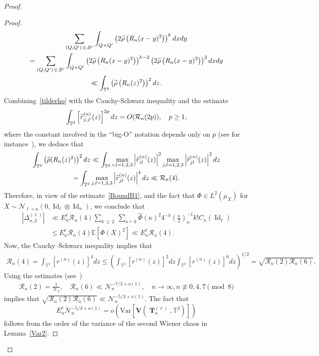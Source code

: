 \documentclass[10pt]{amsart}
\theoremstyle{definition}\newtheorem{defi}[theo]{Definition}\newtheorem{rema}[theo]{Remark}\newtheorem{exam}[theo]{Example}\newtheorem{exem}[theo]{Example}\newtheorem{nota}[theo]{Notation}
\DeclareMathOperator{\Id}{Id}
\DeclareMathOperator{\bT}{\mathbf{T}}
\newcommand{\scN}{\mathscr{N}}
\newcommand{\bfv}{\mathbf{V}}
\newcommand{\clS}{\mathcal{S}}
\newcommand{\clR}{\mathcal{R}}
\newcommand{\T}{\mathbb{T}^3}
\newcommand{\E}[1]{\mathbb{E}\left[#1\right]}
\newcommand{\V}[1]{\mathrm{Var}{\left[#1\right]}}
\newcommand{\notcon}[3]{ {#1} \not\equiv {#2} \pmod {#3} }
\newcommand{\Nn}{\mathcal{N}_n}
\let\oldtilde\tilde
\renewcommand*{\tilde}[1]{\mathchoice{\widetilde{#1}}{\widetilde{#1}}{\oldtilde{#1}}{\oldtilde{#1}}}
\begin{document}
\begin{proof}
\begin{proof}
\begin{multline*}
\sum_{(Q,Q')\,\in\,\clS^c}
\int_{Q\times Q'}
\left(2 \tilde{\rho}\left(R_n(x-y)^2\right) \right)^{k} dxdy\\
= \sum_{(Q,Q')\,\in\,\clS^c}
\int_{Q\times Q'}
\left(2 \tilde{\rho}\left(R_n(x-y)^2\right) \right)^{k-2}
\left(2 \tilde{\rho}\left(R_n(x-y)^2\right) \right)^{2} dxdy \\
\ll \int_{\T}
\left(\tilde{\rho}\left(R_n(z)^2\right) \right)^{2} dz. \\
\end{multline*}
Combining~\eqref{tilderho} with the Cauchy-Schwarz inequality and the estimate
\begin{gather*}
\int_{\T} \left[\tilde{r}^{(n)}_{j,j'}(z)\right]^{2p} dz = O(\clR_n(2p)), \quad p\geq1,
\end{gather*}
where the constant involved in the ``big-O'' notation depends only on $p$ (see for instance~\cite[Lemma~E.2]{Not20}), we deduce that
\begin{multline*}
\int_{\T}
\left(\tilde{\rho}(R_n(z)^2) \right)^{2} dz
\ll \int_{\T}\max_{i,l=1,2,3} \left| \tilde{r}^{(n)}_{il}(z)\right|^2
\max_{j,l=1,2,3} \left| \tilde{r}^{(n)}_{jl}(z)\right|^2 dz \\
= \int_{\T} \max_{j,l=1,2,3} \left| \tilde{r}^{(n)}_{jl}(z)\right|^4 dz \ll \clR_n(4).
\end{multline*}
Therefore, in view of the estimate~\eqref{BoundB1}, and the fact that $\Phi \in L^2(\mu_X)$ for $X \sim\scN_{\ell\times n}(0,\Id_{\ell}\otimes \Id_n)$, we conclude that
\begin{align*}
\left| \Delta_{n,2}^{(\ell)}\right| &\ll E_n^{\ell} \clR_n(4)
\sum_{k\,\geq\,2}\:
\sum_{\kappa \vdash k}
\widehat{\Phi}(\kappa)^2 4^{-k}
\left(\frac{n}{2}\right)^{-1}_{\kappa} k! C_{\kappa}(\Id_{\ell}) \\
&\leq E_n^{\ell} \clR_n(4) \E{\Phi(X)^2}
\ll E_n^{\ell} \clR_n(4).
\end{align*}
Now, the Cauchy--Schwarz inequality implies that
\begin{gather*}
\clR_n(4) = \int_{\T} \left[r^{(n)}(z)\right]^4 dz
\leq \left(\int_{\T} \left[r^{(n)}(z)\right]^2 dz
\int_{\T} [r^{(n)}(z)]^6 dz
\right)^{1/2} = \sqrt{\clR_n(2) \clR_n(6)}.
\end{gather*}
Using the estimates (see~\cite[Eq.~(1.16) and~(1.18)]{BM17})
\begin{gather*}
\clR_n(2) = \frac{1}{\Nn}, \quad
\clR_n(6) \ll \Nn^{-7/3+o(1)}, \quad n\to\infty,\notcon{n}{0,4,7}{8}
\end{gather*}
implies that $\sqrt{\clR_n(2)\clR_n(6)} \ll \Nn^{-5/3+o(1)}$. The fact that
\[
E_n^{\ell}\Nn^{-5/3+o(1)}=o\left(\V{\bfv\left(\bT_n^{(\ell)},\T\right)}\right)
\]
follows from the order of the variance of the second Wiener chaos in Lemma~\ref{Var2}.
\end{proof}




\end{proof}
\end{document}

